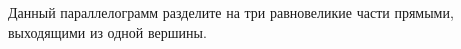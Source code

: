 \begin{ex}
	\begin{condition}
		Данный параллелограмм разделите на три равновеликие части прямыми, выходящими из одной вершины.
	\end{condition}
\end{ex}